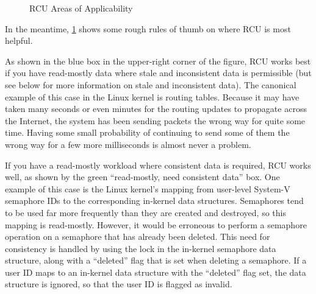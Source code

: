 \begin{figure}
\centering
{}
\caption{RCU Areas of Applicability}
\label{fig:defer:RCU Areas of Applicability}
\end{figure}

In the meantime,
\cref{fig:defer:RCU Areas of Applicability}
shows some rough rules of thumb on where RCU is most helpful.

As shown in the blue box in the upper-right corner of the figure, RCU
works best if you have read-mostly data where stale and inconsistent
data is permissible (but see below for more information on stale and
inconsistent data).
The canonical example of this case in the Linux kernel is routing tables.
Because it may have taken many seconds or even minutes for the
routing updates to propagate across the Internet, the system
has been sending packets the wrong way for quite some time.
Having some small probability of continuing to send some of them the wrong
way for a few more milliseconds is almost never a problem.

If you have a read-mostly workload where consistent data is required,
RCU works well, as shown by the green ``read-mostly, need consistent data''
box.
One example of this case is the Linux kernel's mapping from user-level
System-V semaphore IDs to the corresponding in-kernel data structures.
Semaphores tend to be used far more frequently than they are created
and destroyed, so this mapping is read-mostly.
However, it would be erroneous to perform a semaphore operation on
a semaphore that has already been deleted.
This need for consistency is handled by using the lock in the
in-kernel semaphore data structure, along with a ``deleted''
flag that is set when deleting a semaphore.
If a user ID maps to an in-kernel data structure with the
``deleted'' flag set, the data structure is ignored, so that
the user ID is flagged as invalid.

